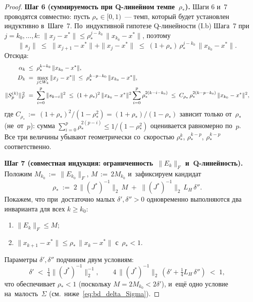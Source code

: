 \begin{proof}
\medskip
\textbf{Шаг 6 (суммируемость при Q-линейном темпе~$\rho_*$).}
Шаги 6 и~7 проводятся совместно: пусть $\rho_*\in[0,1)$~--- темп, который
будет установлен индуктивно в~Шаге~7. По~индуктивной гипотезе Q-линейности
(I.b) Шага~7 при $j=k_0,\dots,k$:
$\|x_j-x^{*}\|\le\rho_*^{j-k_0}\,\|x_{k_0}-x^{*}\|$, поэтому
\[
  \|s_j\| \;\le\; \|x_{j+1}-x^{*}\|+\|x_j-x^{*}\| \;\le\; (1+\rho_*)\,\rho_*^{j-k_0}\,\|x_{k_0}-x^{*}\|.
\]
Отсюда:
\begin{align}
  \alpha_k &\;\le\; \rho_*^{k-k_0}\,\|x_{k_0}-x^{*}\|, \notag\\
  D_k      &\;=\; \max_{j\in W_k}\|x_j-x^{*}\| \;\le\; \rho_*^{k-p-k_0}\,\|x_{k_0}-x^{*}\|, \notag\\
  \|S_p^{(k)}\|_F^{\,2}
           &\;=\; \sum_{i=0}^p \|s_{k-i}\|^2
            \;\le\; (1+\rho_*)^2\,\|x_{k_0}-x^{*}\|^2 \sum_{i=0}^p \rho_*^{2(k-i-k_0)}
            \;\le\; C_{\rho_*}\,\rho_*^{2(k-p-k_0)}\,\|x_{k_0}-x^{*}\|^2, \label{eq:bd_Sp_geom}
\end{align}
где $C_{\rho_*}\,:=\,(1+\rho_*)^2/(1-\rho_*^2) = (1+\rho_*)/(1-\rho_*)$ зависит только
от~$\rho_*$ (не~от~$p$): сумма $\sum_{i=0}^p\rho_*^{2(p-i)}\le 1/(1-\rho_*^2)$
оценивается равномерно по~$p$. Все три величины убывают геометрически
со~скоростью $\rho_*^{k}$, $\rho_*^{k-p}$, $\rho_*^{k-p}$ соответственно.

\medskip
\textbf{Шаг 7 (совместная индукция: ограниченность~$\|E_k\|_F$ и~Q-линейность).}
Положим $M_{k_0}\,:=\,\|E_{k_0}\|_F$, $M\,:=\,2M_{k_0}$ и~зафиксируем кандидат
\begin{equation}\label{eq:bd_rho_star}
  \rho_*
   \;:=\; 2\,\|(J^{*})^{-1}\|_2\,M
        \;+\; \|(J^{*})^{-1}\|_2\,L_H\,\delta''.
\end{equation}
Покажем, что при~достаточно малых $\delta',\delta''>0$ одновременно выполняются
два инварианта для всех $k\ge k_0$:
\begin{enumerate}
  \item[\textup{(I.a)}] $\|E_k\|_F \le M$;
  \item[\textup{(I.b)}] $\|x_{k+1}-x^{*}\| \le \rho_*\,\|x_k-x^{*}\|$ с~$\rho_*<1$.
\end{enumerate}
Параметры $\delta',\delta''$ подчиним двум условиям:
\begin{equation}\label{eq:bd_delta_choice}
  \delta' \;<\; \tfrac{1}{4}\|(J^{*})^{-1}\|_2^{-1},
  \qquad
  4\,\|(J^{*})^{-1}\|_2\,(\delta' + \tfrac14 L_H\,\delta'') \;<\; 1,
\end{equation}
что обеспечивает $\rho_*<1$ (поскольку $M=2M_{k_0}<2\delta'$), и~ещё одно
условие на~малость~$\Sigma$ (см.~ниже~\eqref{eq:bd_delta_Sigma}).


\end{proof}
